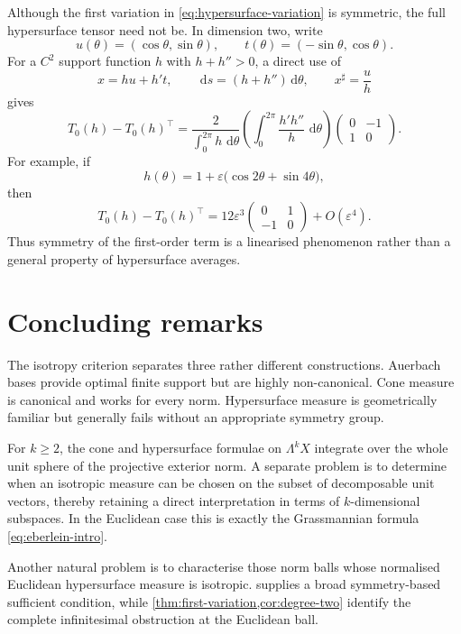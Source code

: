 \documentclass[11pt,a4paper]{amsart}
\numberwithin{equation}{section}
\theoremstyle{plain}
\theoremstyle{definition}
\theoremstyle{remark}
\newcommand{\dd}{\,\mathrm{d}}
\begin{document}
Although the first variation in \eqref{eq:hypersurface-variation} is symmetric, the full hypersurface tensor need not be. In dimension two, write
\[
u(\theta)=(\cos\theta,\sin\theta),
\qquad
t(\theta)=(-\sin\theta,\cos\theta).
\]
For a $C^2$ support function $h$ with $h+h''>0$, a direct use of
\[
x=h u+h't,
\qquad
\dd s=(h+h'')\dd\theta,
\qquad
x^\sharp=\frac{u}{h}
\]
gives
\begin{equation}\label{eq:skew-exact}
T_0(h)-T_0(h)^\top
=\frac{2}{\int_0^{2\pi}h\,\dd\theta}
\left(\int_0^{2\pi}\frac{h'h''}{h}\,\dd\theta\right)
\begin{pmatrix}0&-1\\1&0\end{pmatrix}.
\end{equation}
For example, if
\[
h(\theta)=1+\varepsilon\big(\cos2\theta+\sin4\theta\big),
\]
then
\begin{equation}\label{eq:skew-example}
T_0(h)-T_0(h)^\top
=12\varepsilon^3
\begin{pmatrix}0&1\\-1&0\end{pmatrix}
+O(\varepsilon^4).
\end{equation}
Thus symmetry of the first-order term is a linearised phenomenon rather than a general property of hypersurface averages.

\section{Concluding remarks}

The isotropy criterion separates three rather different constructions. Auerbach bases provide optimal finite support but are highly non-canonical. Cone measure is canonical and works for every norm. Hypersurface measure is geometrically familiar but generally fails without an appropriate symmetry group.

For $k\geqslant2$, the cone and hypersurface formulae on $\Lambda^kX$ integrate over the whole unit sphere of the projective exterior norm. A separate problem is to determine when an isotropic measure can be chosen on the subset of decomposable unit vectors, thereby retaining a direct interpretation in terms of $k$-dimensional subspaces. In the Euclidean case this is exactly the Grassmannian formula \eqref{eq:eberlein-intro}.

Another natural problem is to characterise those norm balls whose normalised Euclidean hypersurface measure is isotropic.  supplies a broad symmetry-based sufficient condition, while \cref{thm:first-variation,cor:degree-two} identify the complete infinitesimal obstruction at the Euclidean ball.
\end{document}
